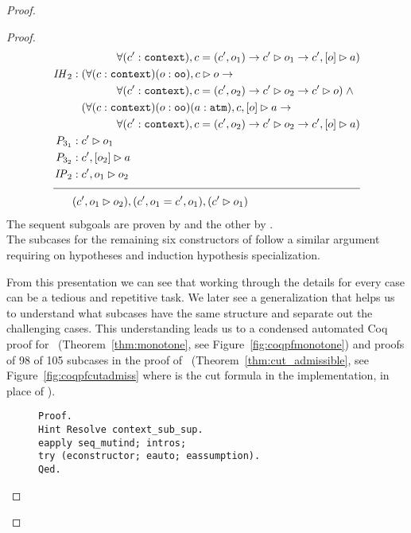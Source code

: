 \begin{proof}
\begin{proof}
\begin{align*}
& \qquad\qquad \forall (\inddyncon{} : \sltm{context}), c = (\inddyncon{}, o_1) \rightarrow \seqsl[\inddyncon{}]{o_1} \rightarrow \bchsl[\inddyncon{}]{o}{a}) \\
\mathit{IH}_2 &: (\forall (c : \sltm{context}) (o : \sltm{oo}), \seqsl[c]{o} \rightarrow \\
& \qquad\qquad \forall (\inddyncon{} : \sltm{context}), c = (\inddyncon{}, o_2) \rightarrow \seqsl[\inddyncon{}]{o_2} \rightarrow \seqsl[\inddyncon{}]{o}) \; \wedge \\
& \;\;\; (\forall (c : \sltm{context}) (o : \sltm{oo}) (a : \sltm{atm}), \bchsl[c]{o}{a} \rightarrow \\
& \qquad\qquad \forall (\inddyncon{} : \sltm{context}), c = (\inddyncon{}, o_2) \rightarrow \seqsl[\inddyncon{}]{o_2} \rightarrow \bchsl[\inddyncon{}]{o}{a}) \\
P_{3_1} &: \seqsl[\inddyncon{}]{o_1} \\
P_{3_2} &: \bchsl[\inddyncon{}]{o_2}{a} \\
\mathit{IP}_2 &: \seqsl[\inddyncon{} , o_1]{o_2} \\[\pfshift{}]
\cline{1-2}
& (\seqsl[\inddyncon{} , o_1]{o_2}), (\inddyncon{} , o_1 = \inddyncon{} , o_1), (\seqsl[\inddyncon{}]{o_1})
\end{align*}
The sequent subgoals are proven by  and the other by . \\

The \rlnmsinit{} subcases for the remaining six constructors of  follow a similar argument requiring  on hypotheses and induction hypothesis specialization. \\

\bigskip

From this presentation we can see that working through the details for every case can be a tedious and repetitive task. We later see a generalization that helps us to understand what subcases have the same structure and separate out the challenging cases. This understanding leads us to a condensed automated Coq proof for~ (Theorem~\ref{thm:monotone}, see Figure~\ref{fig:coqpfmonotone}) and proofs of 98 of 105 subcases in the proof of~ (Theorem~\ref{thm:cut_admissible}, see Figure~\ref{fig:coqpfcutadmiss} where  is the cut formula in the implementation, in place of \delta).
\begin{figure}
\begin{lstlisting}
Proof.
Hint Resolve context_sub_sup.
eapply seq_mutind; intros;
try (econstructor; eauto; eassumption).
Qed.
\end{lstlisting}
\end{figure}


\end{proof}
\end{proof}
